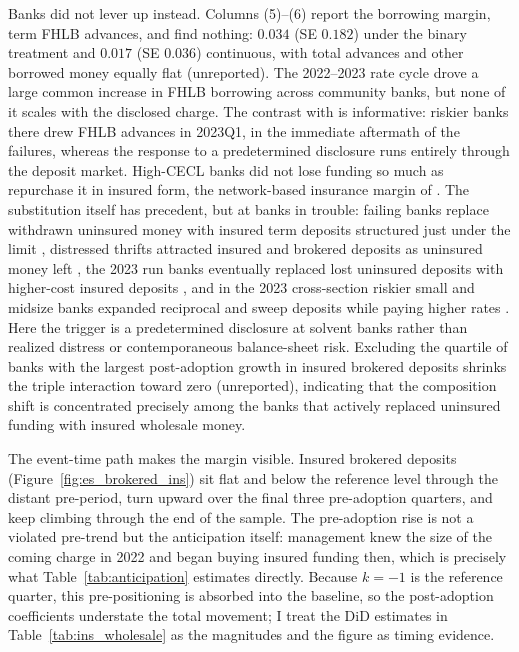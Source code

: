 Banks did not lever up instead.  Columns (5)--(6) report the borrowing
margin, term FHLB advances, and find nothing: $0.034$ (SE $0.182$)
under the binary treatment and $0.017$ (SE $0.036$) continuous, with
total advances and other borrowed money equally flat (unreported).
The 2022--2023 rate cycle drove a large common increase in FHLB
borrowing across community banks, but none of it scales with the
disclosed charge.  The contrast with \citet{huberdeau2025adverse} is
informative: riskier banks there drew FHLB advances in 2023Q1, in the
immediate aftermath of the failures, whereas the response to a
predetermined disclosure runs entirely through the deposit market.
High-CECL banks did not
lose funding so much as repurchase it in insured form, the
network-based insurance margin of \citet{kim2024insurance}.  The
substitution itself has precedent, but at banks in trouble: failing
banks replace withdrawn uninsured money with insured term deposits
structured just under the limit \citep{martin2026deposit}, distressed
thrifts attracted insured and brokered deposits as uninsured money
left \citep{goldberg2002depositor}, the 2023 run banks eventually
replaced lost uninsured deposits with higher-cost insured deposits
\citep{cipriani2024tracing}, and in the 2023 cross-section riskier
small and midsize banks expanded reciprocal and sweep deposits while
paying higher rates \citep{huberdeau2025adverse}.  Here the trigger is
a predetermined disclosure at solvent banks rather than realized
distress or contemporaneous balance-sheet risk.  Excluding
the quartile of banks with the largest post-adoption growth in insured
brokered deposits shrinks the triple interaction toward zero
(unreported), indicating that the composition shift is concentrated
precisely among the banks that actively replaced uninsured funding
with insured wholesale money.

The event-time path makes the margin visible.  Insured brokered
deposits (Figure~\ref{fig:es_brokered_ins}) sit flat and below the
reference level through the distant pre-period, turn upward over the
final three pre-adoption quarters, and keep climbing through the end
of the sample.  The pre-adoption rise is not a violated pre-trend but
the anticipation itself: management knew the size of the coming charge
in 2022 and began buying insured funding then, which is precisely what
Table~\ref{tab:anticipation} estimates directly.  Because $k=-1$ is
the reference quarter, this pre-positioning is absorbed into the
baseline, so the post-adoption coefficients understate the total
movement; I treat the DiD estimates in Table~\ref{tab:ins_wholesale}
as the magnitudes and the figure as timing evidence.


